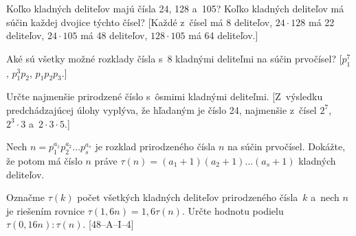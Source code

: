 {
Koľko kladných deliteľov majú čísla 24, 128 a~105? Koľko kladných deliteľov má súčin
každej dvojice týchto čísel? [Každé z~čísel má 8 deliteľov, $24\cdot128$ má 22 deliteľov,
$24\cdot105$ má 48 deliteľov, $128\cdot105$ má 64 deliteľov.]

Aké sú všetky možné rozklady čísla s~8 kladnými deliteľmi na súčin prvočísel?
[$p_1^7$, $p_1^3 p_2$, $p_1 p_2 p_3$.]

Určte najmenšie prirodzené číslo s~ôsmimi kladnými deliteľmi.
[Z~výsledku predchádzajúcej úlohy vyplýva, že hľadaným je číslo 24,
najmenšie z~čísel $2^7$, $2^3\cdot3$ a~$2\cdot3\cdot5$.]

Nech $n=p_1^{a_1}p_2^{a_2}\dots p_s^{a_s}$ je rozklad prirodzeného čísla $n$ na súčin
prvočísel. Dokážte, že potom má číslo $n$ práve $\tau(n)=(a_1+1)(a_2+1)\dots(a_s+1)$
kladných deliteľov.

\D
Označme $\tau(k)$ počet všetkých kladných deliteľov prirodzeného čísla~$k$ a~nech $n$ je riešením rovnice $\tau(1{,}6n)=1{,}6\tau(n)$.
Určte hodnotu podielu $\tau(0{,}16n):\tau(n)$.
\hbox{[48--A--I--4]}
}

